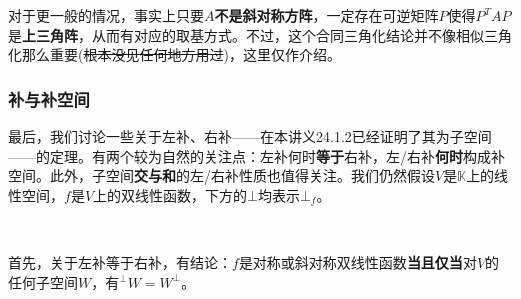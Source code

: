 \documentclass[a4paper,UTF8,fontset=windows,AutoFakeBold]{ctexart}
\newcommand*{\note}{\noindent *}
\begin{document}
\note 对于更一般的情况，事实上只要$A$\textbf{不是斜对称方阵}，一定存在可逆矩阵$P$使得$P^TAP$是\textbf{上三角阵}，从而有对应的取基方式。不过，这个合同三角化结论并不像相似三角化那么重要(\sout{根本没见任何地方用过})，这里仅作介绍。

\subsubsection{补与补空间}
最后，我们讨论一些关于左补、右补——在本讲义24.1.2已经证明了其为子空间——的定理。有两个较为自然的关注点：左补何时\textbf{等于}右补，左/右补\textbf{何时}构成补空间。此外，子空间\textbf{交与和}的左/右补性质也值得关注。我们仍然假设$V$是$\mathbb{K}$上的线性空间，$f$是$V$上的双线性函数，下方的$\bot$均表示$\bot_f$。

\

首先，关于左补等于右补，有结论：$f$是对称或斜对称双线性函数\textbf{当且仅当}对$V$的任何子空间$W$，有$^\bot W=W^\bot$。
\end{document}
